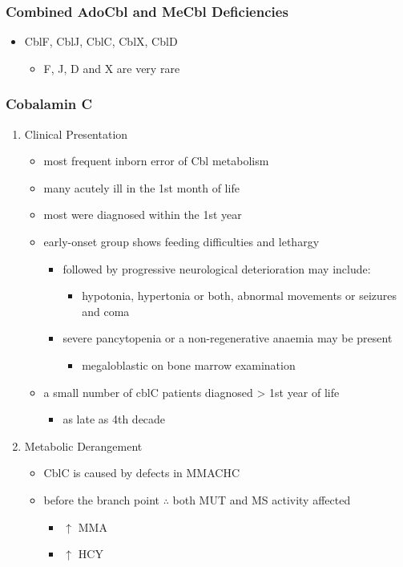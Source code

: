 \documentclass{scrartcl}
\begin{document}
\subsubsection{Combined AdoCbl and MeCbl Deficiencies}
\label{sec:org7047ae2}
\begin{itemize}
\item CblF, CblJ, CblC, CblX, CblD
\begin{itemize}
\item F, J, D and X are very rare
\end{itemize}
\end{itemize}
\subsubsection{Cobalamin C}
\label{sec:org116256d}
\begin{enumerate}
\item Clinical Presentation
\label{sec:orgd3ae7db}
\begin{itemize}
\item most frequent inborn error of Cbl metabolism
\item many acutely ill in the 1st month of life
\item most were diagnosed within the 1st year
\item early-onset group shows feeding difficulties and lethargy
\begin{itemize}
\item followed by progressive neurological deterioration may include: 
\begin{itemize}
\item hypotonia, hypertonia or both, abnormal movements or seizures
and coma
\end{itemize}
\item severe pancytopenia or a non-regenerative anaemia may be present
\begin{itemize}
\item megaloblastic on bone marrow examination
\end{itemize}
\end{itemize}
\item a small number of cblC patients diagnosed \textgreater{} 1st year of life
\begin{itemize}
\item as late as 4th decade
\end{itemize}
\end{itemize}

\item Metabolic Derangement
\label{sec:org112d962}
\begin{itemize}
\item CblC is caused by defects in MMACHC
\item before the branch point \(\therefore\) both MUT and MS activity affected
\begin{itemize}
\item \(\uparrow\) MMA
\item \(\uparrow\) HCY
\end{itemize}
\end{itemize}


\end{enumerate}
\end{document}
